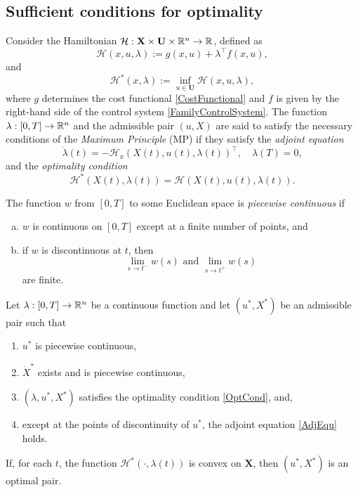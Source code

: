\subsection{Sufficient conditions for optimality}
    Consider the Hamiltonian $\mathcal{H}:\mathbf{X}\times\mathbf{U}\times\mathbb{R}^n\to \mathbb{R}$, defined as 
    \[
        \mathcal{H}(x,u,\lambda):= g(x,u) + \lambda^\top f(x,u),
    \]
    and
    \[ 
        \mathcal{H}^\ast(x,\lambda)  
        := \inf_{u\in\mathbf{U}}\mathcal{H}(x,u,\lambda),
    \]
    where $g$ determines the cost functional 
    \eqref{CostFunctional} and $f$ is given by the right-hand side of the control system 
    \eqref{FamilyControlSystem}.
    The function $\lambda:[0,T]\to \mathbb{R}^n$ and the admissible pair 
    $(u,X)$ are said to satisfy the necessary conditions of the 
    {\it Maximum Principle} (MP) if they satisfy the
    {\it adjoint equation}
    \begin{equation}\label{AdjEqu}
         \dot{\lambda}(t) = -\mathcal{H}_x(X(t),u(t),\lambda(t))^\top, \quad \lambda(T)=0,
    \end{equation}
    and the {\it optimality condition}
    \begin{equation}\label{OptCond}
       \mathcal{H}^\ast(X(t),\lambda(t)) =
        \mathcal{H}(X(t),u(t),\lambda(t)).
   \end{equation}
%
    \begin{definition}\label{PiecewiseCont}
        \rm The function $w$ from $[0,T]$ to some Euclidean space is {\it piecewise continuous} if
        \begin{enumerate}[(a)]
            \item $w$ is continuous on $[0,T]$ except at a finite number of points, and 
            \item if $w$ is discontinuous at $t$, then  
                \[\lim_{s\to t^-}w(s) \mbox{ and } \lim_{s\to t^+}w(s)\]
                are finite. 
    \end{enumerate}
\end{definition}

\begin{theorem} Let $\lambda:[0,T]\to \mathbb{R}^n$  be a continuous function 
    and let $(u^\ast,X^\ast)$ be an admissible pair such that 
    \begin{enumerate}[\rm (a)]
        \item $u^\ast$ is piecewise continuous,
        \item $\dot{X}^\ast$ exists and is piecewise continuous,
        \item $(\lambda,u^\ast,X^\ast)$ satisfies the optimality condition \eqref{OptCond}, and,
        \item except at the points of discontinuity of $u^\ast$, the adjoint equation \eqref{AdjEqu} holds.
    \end{enumerate}
If, for each $t$, the function $\mathcal{H}^\ast(\cdot,\lambda(t))$ is convex on $\mathbf{X}$, then $(u^\ast,X^\ast)$ is an optimal pair.
\end{theorem}


